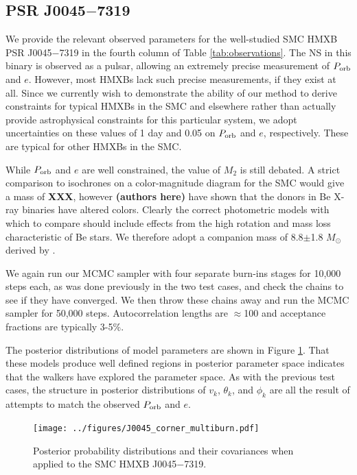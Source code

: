 \documentclass[12pt, preprint]{aastex}
\newcommand{\Msun}{\ifmmode {M_{\odot}}\else${M_{\odot}}$\fi}
\begin{document}
\subsection{PSR J0045$-$7319}


We provide the relevant observed parameters for the well-studied SMC HMXB PSR J0045$-$7319 in the fourth column of Table \ref{tab:observations}. The NS in this binary is observed as a pulsar, allowing an extremely precise measurement of $P_{\rm orb}$ and $e$. However, most HMXBs lack such precise measurements, if they exist at all. Since we currently wish to demonstrate the ability of our method to derive constraints for typical HMXBs in the SMC and elsewhere rather than actually provide astrophysical constraints for this particular system, we adopt uncertainties on these values of 1 day and 0.05 on $P_{\rm orb}$ and $e$, respectively. These are typical for other HMXBs in the SMC. 

While $P_{\rm orb}$ and $e$ are well constrained, the value of $M_2$ is still debated. A strict comparison to isochrones on a color-magnitude diagram for the SMC would give a mass of {\bf XXX}, however {\bf (authors here)} have shown that the donors in Be X-ray binaries have altered colors. Clearly the correct photometric models with which to compare should include effects from the high rotation and mass loss characteristic of Be stars. We therefore adopt a companion mass of 8.8$\pm$1.8 \Msun derived by \citet{bell95}.


We again run our MCMC sampler with four separate burn-ins stages for 10,000 steps each, as was done previously in the two test cases, and check the chains to see if they have converged. We then throw these chains away and run the MCMC sampler for 50,000 steps. Autocorrelation lengths are $\approx$100 and acceptance fractions are typically 3-5\%. 

The posterior distributions of model parameters are shown in Figure \ref{fig:J0045_corner}. That these models produce well defined regions in posterior parameter space indicates that the walkers have explored the parameter space. As with the previous test cases, the structure in posterior distributions of $v_k$, $\theta_k$, and $\phi_k$ are all the result of attempts to match the observed $P_{\rm orb}$ and $e$. 


\begin{figure}[h!]
\begin{center}
\texttt{[image: ../figures/J0045\_corner\_multiburn.pdf]}
\caption{Posterior probability distributions and their covariances when applied to the SMC HMXB J0045$-$7319.}
\label{fig:J0045_corner}
\end{center}
\end{figure}
\end{document}
